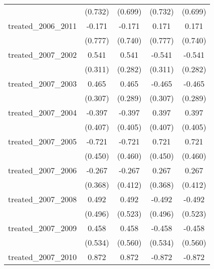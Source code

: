 {\begin{tabular}{l*{4}{c}}
            &     (0.732)         &     (0.699)         &     (0.732)         &     (0.699)         \\
[1em]
treated\_2006\_2011&      -0.171         &      -0.171         &       0.171         &       0.171         \\
            &     (0.777)         &     (0.740)         &     (0.777)         &     (0.740)         \\
[1em]
treated\_2007\_2002&       0.541         &       0.541         &      -0.541         &      -0.541         \\
            &     (0.311)         &     (0.282)         &     (0.311)         &     (0.282)         \\
[1em]
treated\_2007\_2003&       0.465         &       0.465         &      -0.465         &      -0.465         \\
            &     (0.307)         &     (0.289)         &     (0.307)         &     (0.289)         \\
[1em]
treated\_2007\_2004&      -0.397         &      -0.397         &       0.397         &       0.397         \\
            &     (0.407)         &     (0.405)         &     (0.407)         &     (0.405)         \\
[1em]
treated\_2007\_2005&      -0.721         &      -0.721         &       0.721         &       0.721         \\
            &     (0.450)         &     (0.460)         &     (0.450)         &     (0.460)         \\
[1em]
treated\_2007\_2006&      -0.267         &      -0.267         &       0.267         &       0.267         \\
            &     (0.368)         &     (0.412)         &     (0.368)         &     (0.412)         \\
[1em]
treated\_2007\_2008&       0.492         &       0.492         &      -0.492         &      -0.492         \\
            &     (0.496)         &     (0.523)         &     (0.496)         &     (0.523)         \\
[1em]
treated\_2007\_2009&       0.458         &       0.458         &      -0.458         &      -0.458         \\
            &     (0.534)         &     (0.560)         &     (0.534)         &     (0.560)         \\
[1em]
treated\_2007\_2010&       0.872         &       0.872         &      -0.872         &      -0.872         \\

\end{tabular}}
